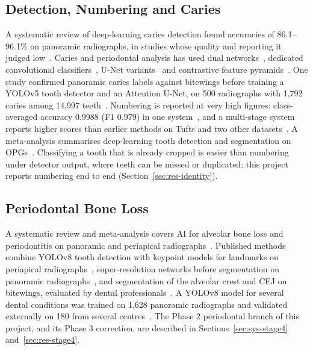\subsection{Detection, Numbering and Caries}

A systematic review of deep-learning caries detection found accuracies of 86.1--96.1\% on panoramic
radiographs, in studies whose quality and reporting it judged low~\cite{mohammadrahimi2022deep}.
Caries and periodontal analysis has used dual networks~\cite{lim2024dual}, dedicated convolutional
classifiers~\cite{bilal2024pdcnet}, U-Net variants~\cite{vickram2025extraction} and contrastive feature
pyramids~\cite{chen2024cariesxrays}. One study confirmed panoramic caries labels against bitewings
before training a YOLOv5 tooth detector and an Attention U-Net, on 500 radiographs with 1,792 caries
among 14,997 teeth~\cite{pornprasertsuk2025clinical}. Numbering is reported at very high figures:
class-averaged accuracy 0.9988 (F1 0.979) in one system~\cite{zancan2025ai}, and a multi-stage system
reports higher scores than earlier methods on Tufts and two other datasets~\cite{zhang2025reliable}. A meta-analysis
summarises deep-learning tooth detection and segmentation on OPGs~\cite{bonfanti2025deep}. Classifying
a tooth that is already cropped is easier than numbering under detector output, where teeth can be
missed or duplicated; this project reports numbering end to end (Section~\ref{sec:res-identity}). %

\subsection{Periodontal Bone Loss}

A systematic review and meta-analysis covers AI for alveolar bone loss and periodontitis on panoramic
and periapical radiographs~\cite{khubrani2025detection}. Published methods combine YOLOv8 tooth
detection with keypoint models for landmarks on periapical radiographs~\cite{wimalasiri2025ai},
super-resolution networks before segmentation on panoramic radiographs~\cite{kong2024integrating}, and
segmentation of the alveolar crest and CEJ on bitewings, evaluated by dental
professionals~\cite{lee2025evaluation}. A YOLOv8 model for several dental conditions was trained on
1,628 panoramic radiographs and validated externally on 180 from several
centres~\cite{muresanu2024automating}. The Phase 2 periodontal branch of this project, and its Phase 3
correction, are described in Sections~\ref{sec:sys-stage4} and~\ref{sec:res-stage4}. %

